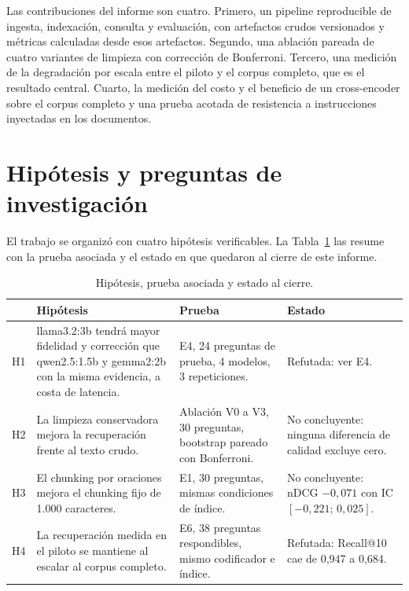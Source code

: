 \documentclass[11pt]{tg_usta}
\begin{document}
Las contribuciones del informe son cuatro. Primero, un pipeline reproducible de ingesta, indexación, consulta y evaluación, con artefactos crudos versionados y métricas calculadas desde esos artefactos. Segundo, una ablación pareada de cuatro variantes de limpieza con corrección de Bonferroni. Tercero, una medición de la degradación por escala entre el piloto y el corpus completo, que es el resultado central. Cuarto, la medición del costo y el beneficio de un cross-encoder sobre el corpus completo y una prueba acotada de resistencia a instrucciones inyectadas en los documentos.

\section{Hipótesis y preguntas de investigación}

El trabajo se organizó con cuatro hipótesis verificables. La Tabla~\ref{tab:hipotesis} las resume con la prueba asociada y el estado en que quedaron al cierre de este informe.

\begin{table}[htbp]
\centering
\footnotesize
\begin{tabular}{@{}p{0.7cm}p{6.1cm}p{4.3cm}p{3.4cm}@{}}
\toprule
 & Hipótesis & Prueba & Estado \\
\midrule
H1 & llama3.2:3b tendrá mayor fidelidad y corrección que qwen2.5:1.5b y gemma2:2b con la misma evidencia, a costa de latencia. & E4, 24 preguntas de prueba, 4 modelos, 3 repeticiones. & Refutada: ver E4. \\
\addlinespace
H2 & La limpieza conservadora mejora la recuperación frente al texto crudo. & Ablación V0 a V3, 30 preguntas, bootstrap pareado con Bonferroni. & No concluyente: ninguna diferencia de calidad excluye cero. \\
\addlinespace
H3 & El chunking por oraciones mejora el chunking fijo de 1.000 caracteres. & E1, 30 preguntas, mismas condiciones de índice. & No concluyente: nDCG $-0,071$ con IC $[-0,221;\,0,025]$. \\
\addlinespace
H4 & La recuperación medida en el piloto se mantiene al escalar al corpus completo. & E6, 38 preguntas respondibles, mismo codificador e índice. & Refutada: Recall@10 cae de 0,947 a 0,684. \\
\bottomrule
\end{tabular}
\caption{Hipótesis, prueba asociada y estado al cierre.}
\label{tab:hipotesis}
\end{table}
\end{document}

